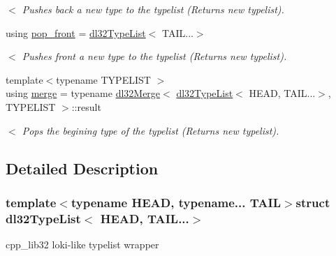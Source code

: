 \begin{DoxyCompactItemize}
\begin{DoxyCompactList}\small\item\em $<$ Pushes back a new type to the typelist (Returns new typelist). \end{DoxyCompactList}\item 
\hypertarget{structdl32_type_list_3_01_h_e_a_d_00_01_t_a_i_l_8_8_8_4_af6a5858f08ca8f143a5584e70330ed0a}{using \hyperlink{structdl32_type_list_3_01_h_e_a_d_00_01_t_a_i_l_8_8_8_4_af6a5858f08ca8f143a5584e70330ed0a}{pop\-\_\-front} = \hyperlink{structdl32_type_list}{dl32\-Type\-List}$<$ T\-A\-I\-L...$>$}\label{structdl32_type_list_3_01_h_e_a_d_00_01_t_a_i_l_8_8_8_4_af6a5858f08ca8f143a5584e70330ed0a}

\begin{DoxyCompactList}\small\item\em $<$ Pushes front a new type to the typelist (Returns new typelist). \end{DoxyCompactList}\item 
\hypertarget{structdl32_type_list_3_01_h_e_a_d_00_01_t_a_i_l_8_8_8_4_a7ebb39a5de4d720703a351443a7d2958}{{\footnotesize template$<$typename T\-Y\-P\-E\-L\-I\-S\-T $>$ }\\using \hyperlink{structdl32_type_list_3_01_h_e_a_d_00_01_t_a_i_l_8_8_8_4_a7ebb39a5de4d720703a351443a7d2958}{merge} = typename \hyperlink{classdl32_merge}{dl32\-Merge}$<$ \hyperlink{structdl32_type_list}{dl32\-Type\-List}$<$ H\-E\-A\-D, T\-A\-I\-L...$>$, T\-Y\-P\-E\-L\-I\-S\-T $>$\-::result}\label{structdl32_type_list_3_01_h_e_a_d_00_01_t_a_i_l_8_8_8_4_a7ebb39a5de4d720703a351443a7d2958}

\begin{DoxyCompactList}\small\item\em $<$ Pops the begining type of the typelist (Returns new typelist). \end{DoxyCompactList}\end{DoxyCompactItemize}


\subsection{Detailed Description}
\subsubsection*{template$<$typename H\-E\-A\-D, typename... T\-A\-I\-L$>$struct dl32\-Type\-List$<$ H\-E\-A\-D, T\-A\-I\-L...$>$}

cpp\-\_\-lib32 loki-\/like typelist wrapper 


